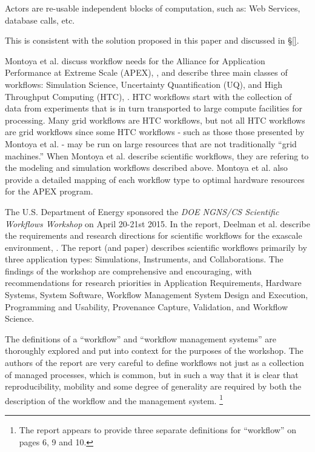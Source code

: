 \begin{displayquote}
Actors are re-usable independent blocks of computation, such as:
Web Services, database calls, etc.
\end{displayquote}

This is consistent with the solution proposed in this paper and discussed in \S \ref{}.

Montoya et al. discuss workflow needs for the Alliance for Application
Performance at Extreme Scale (APEX), \cite{nersc_apex_2016}, and describe
three main classes of workflows: Simulation Science, Uncertainty
Quantification (UQ), and High Throughput Computing (HTC),
\cite{montoya_apex_2016}.
HTC workflows start with the collection of data from experiments that is in turn
transported to large compute facilities for
processing. Many grid workflows are HTC workflows, but not all HTC
workflows are grid workflows since some HTC workflows - such as those
those presented by Montoya et al. - may be run on large resources that
are not traditionally ``grid machines.'' When Montoya et al. describe scientific workflows,
they are refering to the modeling and simulation workflows described above. Montoya et al. also provide a
detailed mapping of each workflow type to optimal hardware resources for the APEX
program.

The U.S. Department of Energy sponsored the \emph{DOE NGNS/CS Scientific
Workflows Workshop} on April 20-21st 2015. In the report, Deelman et al.
describe the requirements and research directions for scientific
workflows for the exascale environment, \cite{deelman_future_2015}\cite{deelman_future_2017}. The report (and paper) describes scientific workflows primarily by three application types:
Simulations, Instruments, and Collaborations. The findings of the workshop are
comprehensive and encouraging, with recommendations for research
priorities in Application Requirements, Hardware Systems, System
Software, Workflow Management System Design and Execution, Programming and Usability,
Provenance Capture, Validation, and Workflow Science.

The definitions of a ``workflow'' and ``workflow management systems''
are thoroughly explored and put into context for the purposes of the
workshop. The authors of the report are very careful to define workflows
not just as a collection of managed processes, which is common, but in
such a way that it is clear that reproducibility, mobility and some
degree of generality are required by both the description of the
workflow and the management system. \footnote{The report appears to provide
three separate definitions for ``workflow'' on pages 6, 9 and 10.}

